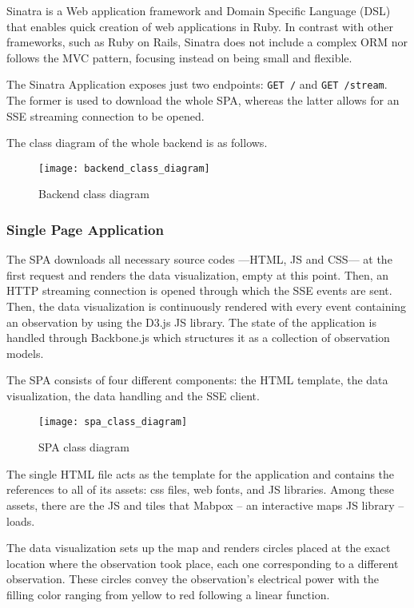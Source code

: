Sinatra is a Web application framework and Domain Specific Language (DSL) that enables quick creation of web applications in Ruby. In contrast with other frameworks, such as Ruby on Rails, Sinatra does not include a complex ORM nor follows the MVC pattern, focusing instead on being small and flexible.

The Sinatra Application exposes just two endpoints: \texttt{GET /} and \texttt{GET /stream}. The former is used to download the whole SPA, whereas the latter allows for an SSE streaming connection to be opened.

The class diagram of the whole backend is as follows.

\begin{figure}[h]
	\centering
	\texttt{[image: backend\_class\_diagram]}
	\caption{Backend class diagram}
	\label{fig:backend_class_diagram}
\end{figure}

\subsubsection{Single Page Application}

The SPA downloads all necessary source codes ---HTML, JS and CSS--- at the first request and renders the data visualization, empty at this point. Then, an HTTP streaming connection is opened  through which the SSE events are sent. Then, the data visualization is continuously rendered with every event containing an observation by using the D3.js JS library. The state of the application is handled through Backbone.js which structures it as a collection of observation models.

The SPA consists of four different components: the HTML template, the data visualization, the data handling and the SSE client.

\begin{figure}[h]
	\centering
	\texttt{[image: spa\_class\_diagram]}
	\caption{SPA class diagram}
	\label{fig:spa_class_diagram}
\end{figure}

The single HTML file acts as the template for the application and contains the references to all of its assets: css files, web fonts, and JS libraries. Among these assets, there are the JS and tiles that Mabpox -- an interactive maps JS library -- loads.

The data visualization sets up the map and renders circles placed at the exact location where the observation took place, each one corresponding to a different observation. These circles convey the observation's electrical power with the filling color ranging from yellow to red following a linear function.

